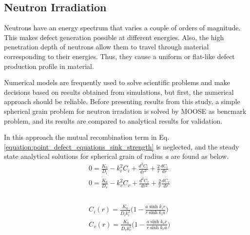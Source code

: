 \documentclass[a4paper]{article}
\begin{document}
  \subsection{Neutron Irradiation} \hspace{10pt}
  Neutrons have an energy spectrum that varies a couple of orders of magnitude. This makes defect generation possible at different energies. Also, the high penetration depth of neutrons allow them to travel through material corresponding to their energies. Thus, they cause a uniform or flat-like defect production profile in material.\cite{was2016}

  Numerical models are frequently used to solve scientific problems and make decisions based on results obtained from simulations, but first, the numerical approach should be reliable. Before presenting results from this study, a simple spherical grain problem for neutron irradation is solved by MOOSE as bencmark problem, and its results are compared to analytical results for validation.

  In this approach the mutual recombination term in Eq. \ref{equation:point_defect_equations_sink_strength} is neglected, and the steady state analytical solutions for spherical grain of radius \textit{a} are found as below.\cite{heald1977}\\

  \begin{equation}
    \begin{aligned}
      &0 = \frac{K_0}{D_i} - k_i^2C_i + \frac{d^2C_i}{dr^2}+\frac{2}{r}\frac{dC_i}{dr}\\
      &0 = \frac{K_0}{D_v} - k_v^2C_v + \frac{d^2C_v}{dr^2}+\frac{2}{r}\frac{dC_v}{dr}\\
    \end{aligned}
    \label{equation:spherical_norecomb_point_defect_equations}
  \end{equation}\\
  \begin{equation}
    \begin{aligned}
      &C_i(r)=\frac{K_0}{D_ik_i^2}\bigg(1-\frac{a\sinh{k_ir}}{r\sinh{k_ia}}\bigg)\\
      &C_v(r)=\frac{K_0}{D_vk_v^2}\bigg(1-\frac{a\sinh{k_vr}}{r\sinh{k_va}}\bigg)\\
    \end{aligned}
    \label{equation:spherical_grain_analytical_solution}
  \end{equation}\\
\end{document}
